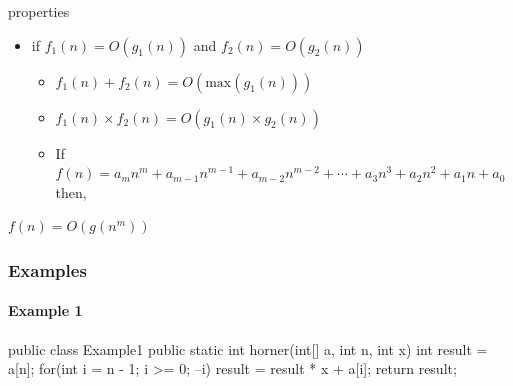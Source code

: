 \begin{mybox}[Periwinkle]{properties}
    \begin{itemize}
        \item[] if $f_1(n) = O(g_1(n))$ and $f_2(n) = O(g_2(n))$
            \begin{itemize}
                \item [1.] $f_1(n) + f_2(n) = O(\text{max}(g_1(n)))$
                \item [2.] $f_1(n) \times f_2(n) = O(g_1(n) \times g_2(n))$
                \item [3.] If $f(n) = a_mn^m + a_{m-1}n^{m-1} + a_{m-2}n^{m-2} + \cdots + a_3n^3 + a_2n^2 + a_1n + a_0$ then,
            \end{itemize}
    \end{itemize}

    \vspace{-0.5cm}

    \begin{center}
        $f(n) = O(g(n^m)) $
    \end{center}
\end{mybox}

\subsubsection{Examples}

\paragraph*{Example 1}

\begin{center}
    \begin{minipage}{0.58\textwidth}
        \begin{tightcode}
public class Example1 {
    public static int horner(int[] a, int n, int x) {
        int result = a[n];
        for(int i = n - 1; i >= 0; --i) {
            result = result * x + a[i];
        }
        return result;
    }
}
        \end{tightcode}
    \end{minipage}
\end{center}


